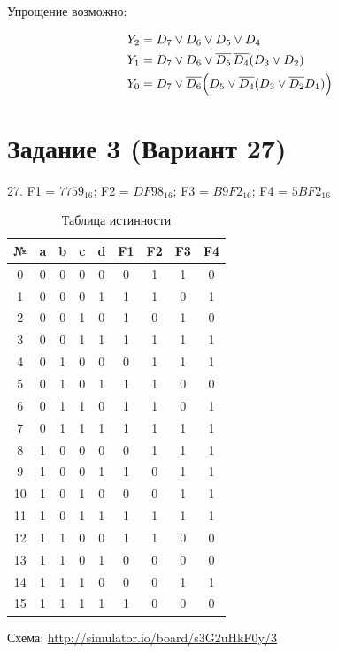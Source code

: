 \documentclass[a4paper,12pt]{article}
\begin{document}
Упрощение возможно:

\begin{equation*}
  \begin{aligned}
    Y_2 &= D_7 \lor D_6 \lor D_5 \lor D_4 \\
    Y_1 &= D_7 \lor D_6 \lor \overline{D_5}\,\overline{D_4}(D_3 \lor D_2) \\
    Y_0 &= D_7 \lor \overline{D_6}\Bigl(D_5 \lor \overline{D_4}(D_3
    \lor \overline{D_2}D_1)\Bigr)
  \end{aligned}
\end{equation*}

\section*{Задание 3 (Вариант 27)}

27. F1 = $7759_{16}$; F2 = $DF98_{16}$; F3 = $B9F2_{16}$; F4 = $5BF2_{16}$

\begin{table}[H]
  \centering
  \begin{tabular}{|c|c|c|c|c||c|c|c|c|}
    \hline
    \textbf{№} & \textbf{a} & \textbf{b} & \textbf{c} & \textbf{d} &
    \textbf{F1} & \textbf{F2} & \textbf{F3} & \textbf{F4} \\ \hline
    0 & 0 & 0 & 0 & 0 & 0 & 1 & 1 & 0 \\ \hline
    1 & 0 & 0 & 0 & 1 & 1 & 1 & 0 & 1 \\ \hline
    2 & 0 & 0 & 1 & 0 & 1 & 0 & 1 & 0 \\ \hline
    3 & 0 & 0 & 1 & 1 & 1 & 1 & 1 & 1 \\ \hline
    4 & 0 & 1 & 0 & 0 & 0 & 1 & 1 & 1 \\ \hline
    5 & 0 & 1 & 0 & 1 & 1 & 1 & 0 & 0 \\ \hline
    6 & 0 & 1 & 1 & 0 & 1 & 1 & 0 & 1 \\ \hline
    7 & 0 & 1 & 1 & 1 & 1 & 1 & 1 & 1 \\ \hline
    8 & 1 & 0 & 0 & 0 & 0 & 1 & 1 & 1 \\ \hline
    9 & 1 & 0 & 0 & 1 & 1 & 0 & 1 & 1 \\ \hline
    10 & 1 & 0 & 1 & 0 & 0 & 0 & 1 & 1 \\ \hline
    11 & 1 & 0 & 1 & 1 & 1 & 1 & 1 & 1 \\ \hline
    12 & 1 & 1 & 0 & 0 & 1 & 1 & 0 & 0 \\ \hline
    13 & 1 & 1 & 0 & 1 & 0 & 0 & 0 & 0 \\ \hline
    14 & 1 & 1 & 1 & 0 & 0 & 0 & 1 & 1 \\ \hline
    15 & 1 & 1 & 1 & 1 & 1 & 0 & 0 & 0 \\ \hline
  \end{tabular}
  \caption{Таблица истинности}
\end{table}

Схема:
\url{http://simulator.io/board/s3G2uHkF0y/3}
\end{document}
